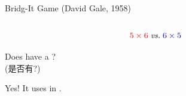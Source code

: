 
\begin{frame}
  \begin{exampleblock}{Bridg-It Game (David Gale, 1958) \qquad
    \href{https://ludii.games/details.php?keyword=Gale}{}}
    \begin{columns}
    \end{columns}

    \[
      \textcolor{red}{5 \times 6} \;\text{\it vs.}\; \textcolor{blue}{6 \times 5}
    \]
  \end{exampleblock}
\end{frame}

\begin{frame}
\end{frame}

\begin{frame}{}
  \begin{center}
    Does  have a ? \\[8pt]

    {(是否有?)}

    \pause
    \vspace{0.80cm}
    Yes! It uses  in .

  \end{center}
\end{frame}




